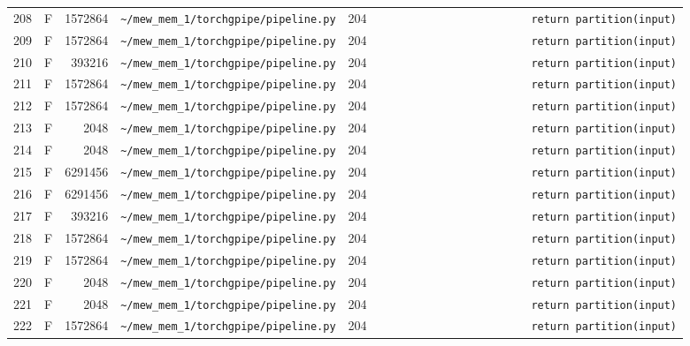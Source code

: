 \documentclass{article}
\begin{document}
\begin{longtable}{r l r p{6.5cm} r p{7.0cm}}
208 & F & 1572864 & \lstinline|~/mew_mem_1/torchgpipe/pipeline.py| & 204 & \lstinline|                        return partition(input)| \\
209 & F & 1572864 & \lstinline|~/mew_mem_1/torchgpipe/pipeline.py| & 204 & \lstinline|                        return partition(input)| \\
210 & F & 393216 & \lstinline|~/mew_mem_1/torchgpipe/pipeline.py| & 204 & \lstinline|                        return partition(input)| \\
211 & F & 1572864 & \lstinline|~/mew_mem_1/torchgpipe/pipeline.py| & 204 & \lstinline|                        return partition(input)| \\
212 & F & 1572864 & \lstinline|~/mew_mem_1/torchgpipe/pipeline.py| & 204 & \lstinline|                        return partition(input)| \\
213 & F & 2048 & \lstinline|~/mew_mem_1/torchgpipe/pipeline.py| & 204 & \lstinline|                        return partition(input)| \\
214 & F & 2048 & \lstinline|~/mew_mem_1/torchgpipe/pipeline.py| & 204 & \lstinline|                        return partition(input)| \\
215 & F & 6291456 & \lstinline|~/mew_mem_1/torchgpipe/pipeline.py| & 204 & \lstinline|                        return partition(input)| \\
216 & F & 6291456 & \lstinline|~/mew_mem_1/torchgpipe/pipeline.py| & 204 & \lstinline|                        return partition(input)| \\
217 & F & 393216 & \lstinline|~/mew_mem_1/torchgpipe/pipeline.py| & 204 & \lstinline|                        return partition(input)| \\
218 & F & 1572864 & \lstinline|~/mew_mem_1/torchgpipe/pipeline.py| & 204 & \lstinline|                        return partition(input)| \\
219 & F & 1572864 & \lstinline|~/mew_mem_1/torchgpipe/pipeline.py| & 204 & \lstinline|                        return partition(input)| \\
220 & F & 2048 & \lstinline|~/mew_mem_1/torchgpipe/pipeline.py| & 204 & \lstinline|                        return partition(input)| \\
221 & F & 2048 & \lstinline|~/mew_mem_1/torchgpipe/pipeline.py| & 204 & \lstinline|                        return partition(input)| \\
222 & F & 1572864 & \lstinline|~/mew_mem_1/torchgpipe/pipeline.py| & 204 & \lstinline|                        return partition(input)| \\

\end{longtable}
\end{document}

